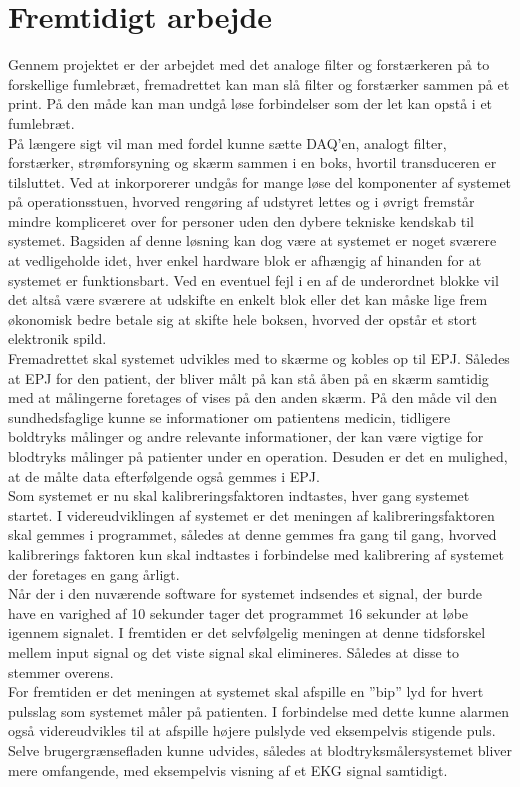 \section{Fremtidigt arbejde} \label{fremtid}
Gennem projektet er der arbejdet med det analoge filter og forstærkeren på to forskellige fumlebræt, fremadrettet kan man slå filter og forstærker sammen på et print. På den måde kan man undgå løse forbindelser som der let kan opstå i et fumlebræt.\\[1ex]
På længere sigt vil man med fordel kunne sætte DAQ’en, analogt filter, forstærker, strømforsyning og skærm sammen i en boks, hvortil transduceren er tilsluttet. Ved at inkorporerer undgås for mange løse del komponenter af systemet på operationsstuen, hvorved rengøring af udstyret lettes og i øvrigt fremstår mindre kompliceret over for personer uden den dybere tekniske kendskab til systemet. Bagsiden af denne løsning kan dog være at systemet er noget sværere at vedligeholde idet, hver enkel hardware blok er afhængig af hinanden for at systemet er funktionsbart. Ved en eventuel fejl i en af de underordnet blokke vil det altså være sværere at udskifte en enkelt blok eller det kan måske lige frem økonomisk bedre betale sig at skifte hele boksen, hvorved der opstår et stort elektronik spild.\\[1ex]
Fremadrettet skal systemet udvikles med to skærme og kobles op til EPJ. Således at EPJ for den patient, der bliver målt på kan stå åben på en skærm samtidig med at målingerne foretages of vises på den anden skærm. På den måde vil den sundhedsfaglige kunne se informationer om patientens medicin, tidligere boldtryks målinger og andre relevante informationer, der kan være vigtige for blodtryks målinger på patienter under en operation. Desuden er det en mulighed, at de målte data efterfølgende også gemmes i EPJ.\\[1ex]
Som systemet er nu skal kalibreringsfaktoren indtastes, hver gang systemet startet. I videreudviklingen af systemet er det meningen af kalibreringsfaktoren skal gemmes i programmet, således at denne gemmes fra gang til gang, hvorved kalibrerings faktoren kun skal indtastes i forbindelse med kalibrering af systemet der foretages en gang årligt. \\ [1ex]
Når der i den nuværende software for systemet indsendes et signal, der burde have en varighed af 10 sekunder tager det programmet 16 sekunder at løbe igennem signalet. I fremtiden er det selvfølgelig meningen at denne tidsforskel mellem input signal og det viste signal skal elimineres. Således at disse to stemmer overens.\\[1ex]
For fremtiden er det meningen at systemet skal afspille en ”bip” lyd for hvert pulsslag som systemet måler på patienten. I forbindelse med dette kunne alarmen også videreudvikles til at afspille højere pulslyde ved eksempelvis stigende puls. \\[1ex]
Selve brugergrænsefladen kunne udvides, således at blodtryksmålersystemet bliver mere omfangende, med eksempelvis visning af et EKG signal samtidigt.\\

